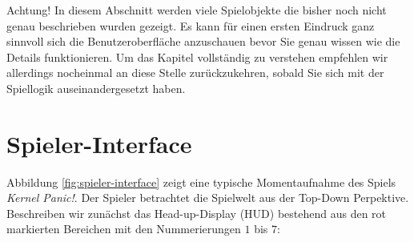 Achtung! In diesem Abschnitt werden viele Spielobjekte die bisher noch nicht genau beschrieben wurden gezeigt. Es kann für einen ersten Eindruck ganz sinnvoll sich die Benutzeroberfläche anzuschauen bevor Sie genau wissen wie die Details funktionieren. Um das Kapitel vollständig zu verstehen empfehlen wir allerdings nocheinmal an diese Stelle zurückzukehren, sobald Sie sich mit der Spiellogik auseinandergesetzt haben.
\section{Spieler-Interface}
%
%
%
%
%
%
%
%
Abbildung \ref{fig:spieler-interface} zeigt eine typische Momentaufnahme des Spiels \textit{Kernel Panic!}.
Der Spieler betrachtet die Spielwelt aus der Top-Down Perpektive.\\
Beschreiben wir zunächst das Head-up-Display (HUD) bestehend aus den rot markierten Bereichen mit den Nummerierungen $1$ bis $7$:

